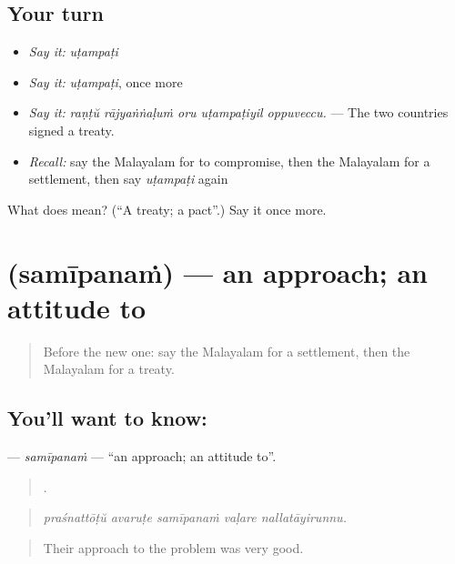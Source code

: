 \subsection*{Your turn}
\begin{itemize}
\raggedright
  \item \emph{Say it:} \emph{uṭampaṭi}
  \item \emph{Say it:} \emph{uṭampaṭi}, once more
  \item \emph{Say it:} \emph{raṇṭŭ rājyaṅṅaḷuṁ oru uṭampaṭiyil oppuveccu.} — The two countries signed a treaty.
  \item \emph{Recall:} say the Malayalam for to compromise, then the Malayalam for a settlement, then say \emph{uṭampaṭi} again
\end{itemize}

\begin{tcolorbox}[breakable,colback=teal!4,colframe=teal!35!black,title={Before you move on}]
What does  mean? (\textquotedblleft{}A treaty; a pact\textquotedblright{}.) Say it once more.
\end{tcolorbox}
\section[\texorpdfstring{\ml{സമീപനം} (samīpanaṁ)}{സമീപനം (samīpanaṁ)}]{ (samīpanaṁ) — an approach; an attitude to}

\label{lesson:ML-C452-samipanam}



\begin{quote}
Before the new one: say the Malayalam for a settlement, then the Malayalam for a treaty.
\end{quote}

\subsection*{You'll want to know: }
\textbf{} — \emph{samīpanaṁ} — \textquotedblleft{}an approach; an attitude to\textquotedblright{}.

\begin{quote}
    .
\end{quote}

\begin{quote}
\emph{praśnattōṭŭ avaruṭe samīpanaṁ vaḷare nallatāyirunnu.}
\end{quote}

\begin{quote}
Their approach to the problem was very good.
\end{quote}

